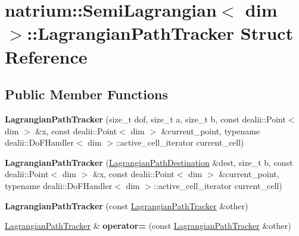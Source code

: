 \hypertarget{structnatrium_1_1SemiLagrangian_1_1LagrangianPathTracker}{
\section{natrium::SemiLagrangian$<$ dim $>$::LagrangianPathTracker Struct Reference}
\label{structnatrium_1_1SemiLagrangian_1_1LagrangianPathTracker}
}
\subsection*{Public Member Functions}
\begin{DoxyCompactItemize}
\item 
\hypertarget{structnatrium_1_1SemiLagrangian_1_1LagrangianPathTracker_a9458337bf047fbd2244b7d35deeee92a}{
{\bfseries LagrangianPathTracker} (size\_\-t dof, size\_\-t a, size\_\-t b, const dealii::Point$<$ dim $>$ \&x, const dealii::Point$<$ dim $>$ \&current\_\-point, typename dealii::DoFHandler$<$ dim $>$::active\_\-cell\_\-iterator current\_\-cell)}
\label{structnatrium_1_1SemiLagrangian_1_1LagrangianPathTracker_a9458337bf047fbd2244b7d35deeee92a}

\item 
\hypertarget{structnatrium_1_1SemiLagrangian_1_1LagrangianPathTracker_aa68994ed2db8eea2a1336e1961b6cdd0}{
{\bfseries LagrangianPathTracker} (\hyperlink{structnatrium_1_1SemiLagrangian_1_1LagrangianPathDestination}{LagrangianPathDestination} \&dest, size\_\-t b, const dealii::Point$<$ dim $>$ \&x, const dealii::Point$<$ dim $>$ \&current\_\-point, typename dealii::DoFHandler$<$ dim $>$::active\_\-cell\_\-iterator current\_\-cell)}
\label{structnatrium_1_1SemiLagrangian_1_1LagrangianPathTracker_aa68994ed2db8eea2a1336e1961b6cdd0}

\item 
\hypertarget{structnatrium_1_1SemiLagrangian_1_1LagrangianPathTracker_a2ff9e5b3673f8bba70d500b00fdea2f4}{
{\bfseries LagrangianPathTracker} (const \hyperlink{structnatrium_1_1SemiLagrangian_1_1LagrangianPathTracker}{LagrangianPathTracker} \&other)}
\label{structnatrium_1_1SemiLagrangian_1_1LagrangianPathTracker_a2ff9e5b3673f8bba70d500b00fdea2f4}

\item 
\hypertarget{structnatrium_1_1SemiLagrangian_1_1LagrangianPathTracker_aa3b4dbe5e15f33f0ae02deced5eae7d3}{
\hyperlink{structnatrium_1_1SemiLagrangian_1_1LagrangianPathTracker}{LagrangianPathTracker} \& {\bfseries operator=} (const \hyperlink{structnatrium_1_1SemiLagrangian_1_1LagrangianPathTracker}{LagrangianPathTracker} \&other)}
\label{structnatrium_1_1SemiLagrangian_1_1LagrangianPathTracker_aa3b4dbe5e15f33f0ae02deced5eae7d3}

\end{DoxyCompactItemize}
